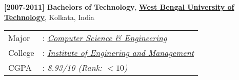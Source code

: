 \documentclass[8pt]{article}
\begin{document}
\textbf{[2007-2011] Bachelors of Technology}, \href{http://www.wbut.ac.in/}{\textbf{West Bengal University of Technology}},  Kolkata, India
\vspace{-2mm}
\hspace{0.6cm}
\begin{tabular}[t]{@{}p{24pt}p{\rcollength+200pt}}
        Major   &: \href{http://cse.iitk.ac.in/}{\em Computer Science \& Engineering} \\
        College &: \href{http://www.iemcal.com/}{\emph{Institute of Enginering and Management}}\\
        CGPA    &: {\em 8.93/10 (Rank: $< 10$)} \\[5pt]
\end{tabular}
\vspace{0.1cm}
\end{document}
